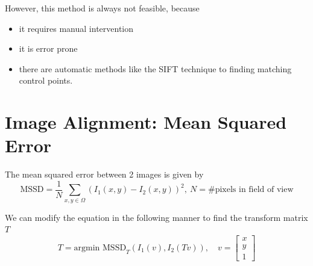 \documentclass{report}
\begin{document}
\noindent However, this method is always not feasible, because
\begin{itemize}
  \item it requires manual intervention
  \item it is error prone
  \item there are automatic methods like the SIFT technique to finding matching control points.
\end{itemize}

\section{Image Alignment: Mean Squared Error}

\noindent The mean squared error between 2 images is given by
$$
  \text{MSSD} = \frac{1}{N} \underset{x,y\in\Omega}{\sum} (I_1(x,y)-I_2(x,y))^2, \ N = \#\text{pixels in field of view}
$$

\noindent We can modify the equation in the following manner to find the transform matrix $T$
$$
  T = \text{argmin MSSD}_T (I_1(v), I_2(Tv)), \quad
  v = \begin{bmatrix}
    x \\
    y \\
    1
  \end{bmatrix}
$$
\end{document}
